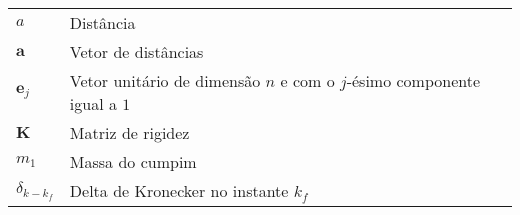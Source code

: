 \begin{longtable}{ll}
$a$ & Distância\\
$\textbf{a}$ & Vetor de distâncias\\
$\textbf{e}_{j}$ & Vetor unitário de dimensão $n$ e com o $j$-ésimo componente igual a $1$ \\
$\textbf{K}$ & Matriz de rigidez\\
$m_1$ & Massa do cumpim\\
$\delta_{k-k_f}$ & Delta de Kronecker no instante $k_f$\\

\end{longtable}

